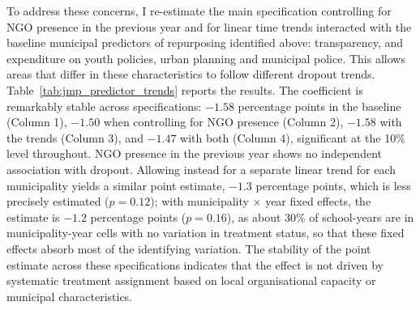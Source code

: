 \documentclass[12pt]{article}
\theoremstyle{plain}
\theoremstyle{plain}
\theoremstyle{plain}
\theoremstyle{definition}
\theoremstyle{plain}
\theoremstyle{definition}
\theoremstyle{plain}
\theoremstyle{remark}
\theoremstyle{definition}
\theoremstyle{definition}
\theoremstyle{plain}
\begin{document}
To address these concerns, I re-estimate the main specification controlling for NGO presence in the previous year and for linear time trends interacted with the baseline municipal predictors of repurposing identified above: transparency, and expenditure on youth policies, urban planning and municipal police. This allows areas that differ in these characteristics to follow different dropout trends. Table~\ref{tab:jmp_predictor_trends} reports the results. The coefficient is remarkably stable across specifications: $-1.58$ percentage points in the baseline (Column 1), $-1.50$ when controlling for NGO presence (Column 2), $-1.58$ with the trends (Column 3), and $-1.47$ with both (Column 4), significant at the 10\% level throughout. NGO presence in the previous year shows no independent association with dropout. Allowing instead for a separate linear trend for each municipality yields a similar point estimate, $-1.3$ percentage points, which is less precisely estimated ($p=0.12$); with municipality $\times$ year fixed effects, the estimate is $-1.2$ percentage points ($p=0.16$), as about 30\% of school-years are in municipality-year cells with no variation in treatment status, so that these fixed effects absorb most of the identifying variation. The stability of the point estimate across these specifications indicates that the effect is not driven by systematic treatment assignment based on local organisational capacity or municipal characteristics.
\end{document}
